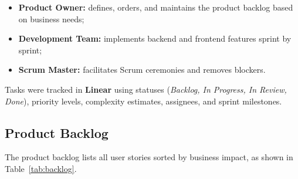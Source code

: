 \documentclass[12pt,a4paper]{report}
\begin{document}
\begin{itemize}
  \item \textbf{Product Owner:} defines, orders, and maintains the product backlog based on business needs;
  \item \textbf{Development Team:} implements backend and frontend features sprint by sprint;
  \item \textbf{Scrum Master:} facilitates Scrum ceremonies and removes blockers.
\end{itemize}

Tasks were tracked in \textbf{Linear} using statuses (\textit{Backlog, In Progress,
In Review, Done}), priority levels, complexity estimates, assignees, and sprint milestones.

\subsection{Product Backlog}

The product backlog lists all user stories sorted by business impact,
as shown in Table~\ref{tab:backlog}.
\end{document}
